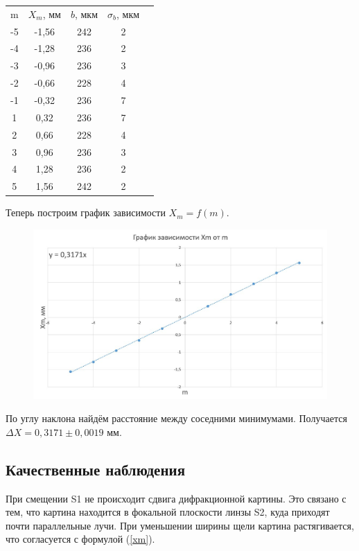 \documentclass[a4paper,12pt]{article}
\begin{document}
\begin{table}[H]
    \centering
    \begin{tabular}{ccccc}
      m  & $X_m$, мм  & $b$, мкм & $\sigma_b$, мкм \\
      -5   & -1,56  & 242  & 2 \\
      -4   & -1,28  & 236  & 2 \\
      -3   & -0,96  & 236  & 3 \\
      -2   & -0,66  & 228  & 4 \\
      -1   & -0,32  & 236  & 7 \\
       1   &  0,32  & 236  & 7 \\
       2   &  0,66  & 228  & 4 \\
       3   &  0,96  & 236  & 3 \\
       4   &  1,28  & 236  & 2 \\
       5   &  1,56  & 242  & 2 \\
    \end{tabular}
    \label{tab:my_label1}
\end{table}

Теперь построим график зависимости $X_m = f(m)$.

\begin{figure}[H]
	\centering
	\includegraphics[scale=0.75]{graph2.jpg}
	\label{graph1}
\end{figure}

По углу наклона найдём расстояние между соседними минимумами. Получается $\Delta	X = 0,3171 \pm 0,0019$ мм.

\subsection{Качественные наблюдения}
При смещении S1 не происходит сдвига дифракционной картины. 
Это связано с тем, что картина находится в фокальной плоскости 
линзы S2, куда приходят почти параллельные лучи. При уменьшении 
ширины щели картина растягивается, что согласуется с формулой 
(\ref{xm}).
\end{document}
